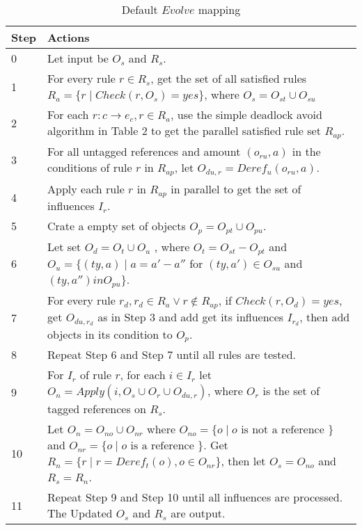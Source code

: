\documentclass[9pt,a4paper,twoside]{article}
\begin{document}
                \begin{table}[!htbp]
                    \centering
                    \begin{tabularx}{\textwidth}{lX}
                        \toprule
                        Step & Actions \\ 
                        \midrule
                        0    & Let input be $O_s$ and $R_s$.\\
                        1    & For every rule $r\in R_s$, get the set of all satisfied rules $R_a=\{r \mid Check(r, O_s) = yes \}$, where $O_s = O_{st} \cup O_{su}$ \\
                        2    & For each $r: c \rightarrow e_c, r \in R_a$, use the simple deadlock avoid algorithm in Table 2 to get the parallel satisfied rule set $R_{ap}$.\\
                        3    & For all untagged references and amount $(o_{ru}, a)$ in the conditions of rule $r$ in $R_{ap}$, let $O_{du,r} = Deref_u(o_{ru}, a)$.\\
                        4    & Apply each rule $r$ in $R_{ap}$ in parallel to get the set of influences $I_r$.\\
                        5    & Crate a empty set of objects $O_p = O_{pt} \cup O_{pu}$.\\
                        6    & Let set $O_d = O_t \cup O_u$ , where $O_t = O_{st} - O_{pt}$ and $O_u = \{(ty,a)\mid a = a' - a'' $ for $ (ty, a') \in O_{su} $ and $ (ty, a'') in O_{pu} \}$.\\
                        7    & For every rule $r_d, r_d \in R_a \vee r\notin R_{ap}$, if $Check(r, O_d) = yes$, get $O_{du,r_d}$ as in Step 3 and add get its influences $I_{r_d}$, then add objects in its condition to $O_p$.\\
                        8    & Repeat Step 6 and Step 7 until all rules are tested.\\
                        9    & For $I_r$ of rule $r$, for each $i \in I_r$ let $O_n = Apply(i, O_s \cup O_r \cup O_{du,r})$, where $O_r$ is the set of tagged references on $R_s$.\\
                        10   & Let $O_n = O_{no} \cup O_{nr}$ where $O_{no}=\{ o \mid o \text{ is not a reference }\}$ and $O_{nr}=\{ o \mid o \text{ is a reference }\}$. Get $R_n=\{r \mid r = Deref_t(o), o \in O_{nr}\}$, then let $O_s = O_{no}$ and $R_s = R_n$.\\
                        11   & Repeat Step 9 and Step 10 until all influences are processed. The Updated $O_s$ and $R_s$ are output.\\
                        \bottomrule
                    \end{tabularx}
                    \caption{Default $Evolve$ mapping}
                    \label{tab:evolve}
                \end{table}
\end{document}
